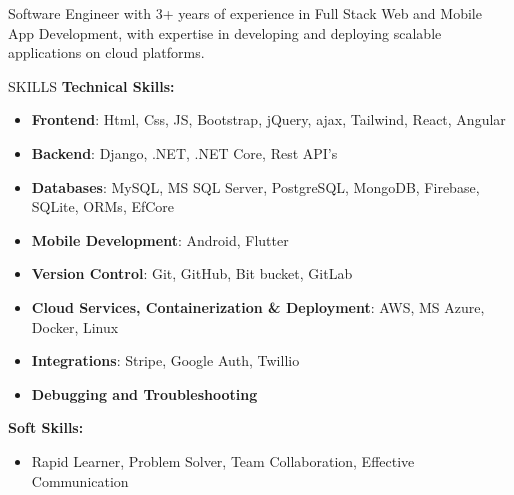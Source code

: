 \documentclass{resume} %
\begin{document}

\begin{rSection}%

{Software Engineer with 3+ years of experience in Full Stack Web and Mobile App Development, with expertise in developing and deploying scalable applications on cloud platforms.}


\end{rSection}


\begin{rSection}{SKILLS}
\textbf{Technical Skills:}
\begin{itemize}
	\item \textbf{Frontend}: Html, Css, JS, Bootstrap, jQuery, ajax, Tailwind, React, Angular
	\item \textbf{Backend}:  Django, .NET, .NET Core, Rest API's
	\item \textbf{Databases}: MySQL, MS SQL Server, PostgreSQL, MongoDB, Firebase, SQLite, ORMs, EfCore
	\item \textbf{Mobile Development}: Android, Flutter
	\item \textbf{Version Control}: Git, GitHub, Bit bucket, GitLab
	\item \textbf{Cloud Services, Containerization \& Deployment}: AWS, MS Azure, Docker, Linux
	\item \textbf{Integrations}: Stripe, Google Auth, Twillio
	\item \textbf{Debugging and Troubleshooting}
	
\end{itemize}


\textbf{Soft Skills:} 
\begin{itemize}
\item Rapid Learner, Problem Solver, Team Collaboration, Effective Communication
\end{itemize}


\end{rSection}
\end{document}
